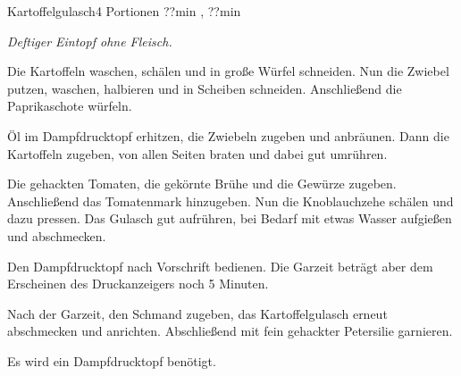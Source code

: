 \documentclass[../recipe-collections/cooking.tex]{subfiles}
\begin{document}
\begin{recipe}{Kartoffelgulasch}{4 Portionen }{??min , ??min }

  \freeform{}\textit{Deftiger Eintopf ohne Fleisch.}


  Die Kartoffeln waschen, schälen und in große Würfel schneiden.
  Nun die Zwiebel putzen, waschen, halbieren und in Scheiben schneiden.
  Anschließend die Paprikaschote würfeln.


  Öl im Dampfdrucktopf erhitzen, die Zwiebeln zugeben und anbräunen.
  Dann die Kartoffeln zugeben, von allen Seiten braten und dabei gut umrühren.


  Die gehackten Tomaten, die gekörnte Brühe und die Gewürze zugeben.
  Anschließend das Tomatenmark hinzugeben.
  Nun die Knoblauchzehe schälen und dazu pressen.
  Das Gulasch gut aufrühren, bei Bedarf mit etwas Wasser aufgießen und abschmecken.

  \newstep{}Den Dampfdrucktopf nach Vorschrift bedienen.
  Die Garzeit beträgt aber dem Erscheinen des Druckanzeigers noch 5 Minuten.


  Nach der Garzeit, den Schmand zugeben, das Kartoffelgulasch erneut abschmecken und anrichten.
  Abschließend mit fein gehackter Petersilie garnieren.

  \freeform{}\hrulefill{}

  \freeform{}
  Es wird ein Dampfdrucktopf benötigt.

\end{recipe}
\end{document}

